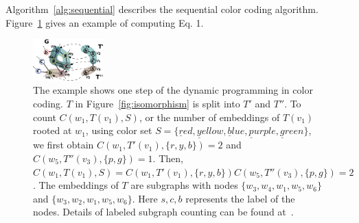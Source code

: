 Algorithm~\ref{alg:sequential} describes the sequential color coding algorithm.
Figure~\ref{fig:example-dp} gives an example of computing Eq. 1.

\begin{figure}[htbp]
\centerline{\includegraphics[width=0.24\textwidth]{plots/paths.eps}}

\caption{The example shows one step of the dynamic programming in color coding.
$T$ in Figure~\ref{fig:isomorphism} is split into $T'$ and $T''$. To count
$C(w_1, T(v_1), S)$, or the number of embeddings of $T(v_1)$ rooted at $w_1$,
using color set $S=\{\underline{r}ed, \underline{y}ellow, \underline{b}lue,
\underline{p}urple, \underline{g}reen\}$, we first obtain $C(w_1, T'(v_1), \{r,
y, b\})=2$ and $C(w_5, T''(v_3), \{p, g\})=1$.  Then, $C(w_1, T(v_1), S) =
C(w_1, T'(v_1), \{r, y, b\}) C(w_5, T''(v_3), \{p, g\})=2$.  The
embeddings of $T$ are subgraphs with nodes $\{w_3, w_4, w_1, w_5, w_6\}$ and
$\{w_3, w_2, w_1, w_5, w_6\}$. Here $s, c, b$ represents the label of the nodes.
Details of labeled subgraph counting can be found at~\cite{zhao2012sahad}.}

\label{fig:example-dp}
\end{figure}

